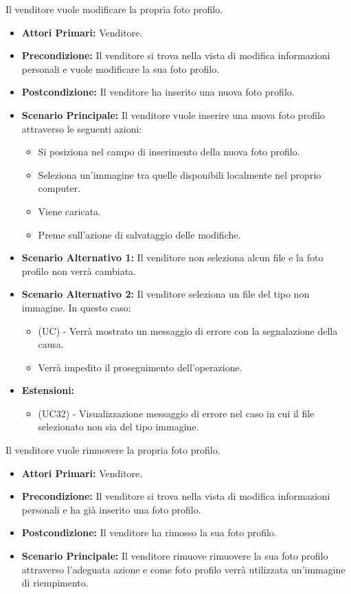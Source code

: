 Il venditore vuole modificare la propria foto profilo.
\begin{itemize}
    \item \textbf{Attori Primari:} Venditore.
    \item \textbf{Precondizione:} Il venditore si trova nella vista di modifica informazioni personali e vuole modificare la sua foto profilo.
    \item \textbf{Postcondizione:} Il venditore ha inserito una nuova foto profilo.
    \item \textbf{Scenario Principale:} Il venditore vuole inserire una nuova foto profilo attraverso le seguenti azioni:
    \begin{itemize}
        \item Si posiziona nel campo di inserimento della nuova foto profilo.
        \item Seleziona un'immagine tra quelle disponibili localmente nel proprio computer.
        \item Viene caricata.
        \item Preme sull'azione di salvataggio delle modifiche.
    \end{itemize}
    \item \textbf{Scenario Alternativo 1:} Il venditore non seleziona alcun file e la foto profilo non verrà cambiata.
    \item \textbf{Scenario Alternativo 2:} Il venditore seleziona un file del tipo non immagine. In questo caso:
    \begin{itemize}
        \item (UC) - Verrà mostrato un messaggio di errore con la segnalazione della causa.
        \item Verrà impedito il proseguimento dell'operazione.
    \end{itemize}
    \item \textbf{Estensioni:}
    \begin{itemize}
        \item (UC32) - Visualizzazione messaggio di errore nel caso in cui il file selezionato non sia del tipo immagine.
    \end{itemize}
\end{itemize}

Il venditore vuole rimuovere la propria foto profilo.
\begin{itemize}
    \item \textbf{Attori Primari:} Venditore.
    \item \textbf{Precondizione:} Il venditore si trova nella vista di modifica informazioni personali e ha già inserito una foto profilo.
    \item \textbf{Postcondizione:} Il venditore ha rimosso la sua foto profilo.
    \item \textbf{Scenario Principale:} Il venditore rimuove rimuovere la sua foto profilo attraverso l'adeguata azione e come foto profilo verrà utilizzata un'immagine di riempimento.
\end{itemize}

